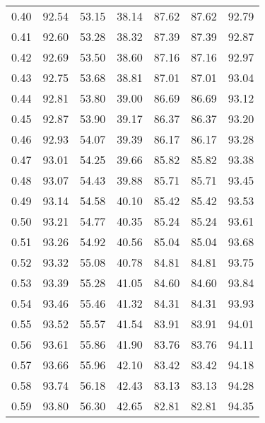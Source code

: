 \begin{tabular}{|c|c|c|c|c|c|c|}
      0.40 &     92.54 &     53.15 &      38.14 &   87.62 &      87.62 &         92.79 \\
      0.41 &     92.60 &     53.28 &      38.32 &   87.39 &      87.39 &         92.87 \\
      0.42 &     92.69 &     53.50 &      38.60 &   87.16 &      87.16 &         92.97 \\
      0.43 &     92.75 &     53.68 &      38.81 &   87.01 &      87.01 &         93.04 \\
      0.44 &     92.81 &     53.80 &      39.00 &   86.69 &      86.69 &         93.12 \\
      0.45 &     92.87 &     53.90 &      39.17 &   86.37 &      86.37 &         93.20 \\
      0.46 &     92.93 &     54.07 &      39.39 &   86.17 &      86.17 &         93.28 \\
      0.47 &     93.01 &     54.25 &      39.66 &   85.82 &      85.82 &         93.38 \\
      0.48 &     93.07 &     54.43 &      39.88 &   85.71 &      85.71 &         93.45 \\
      0.49 &     93.14 &     54.58 &      40.10 &   85.42 &      85.42 &         93.53 \\
      0.50 &     93.21 &     54.77 &      40.35 &   85.24 &      85.24 &         93.61 \\
      0.51 &     93.26 &     54.92 &      40.56 &   85.04 &      85.04 &         93.68 \\
      0.52 &     93.32 &     55.08 &      40.78 &   84.81 &      84.81 &         93.75 \\
      0.53 &     93.39 &     55.28 &      41.05 &   84.60 &      84.60 &         93.84 \\
      0.54 &     93.46 &     55.46 &      41.32 &   84.31 &      84.31 &         93.93 \\
      0.55 &     93.52 &     55.57 &      41.54 &   83.91 &      83.91 &         94.01 \\
      0.56 &     93.61 &     55.86 &      41.90 &   83.76 &      83.76 &         94.11 \\
      0.57 &     93.66 &     55.96 &      42.10 &   83.42 &      83.42 &         94.18 \\
      0.58 &     93.74 &     56.18 &      42.43 &   83.13 &      83.13 &         94.28 \\
      0.59 &     93.80 &     56.30 &      42.65 &   82.81 &      82.81 &         94.35 \\

\end{tabular}
